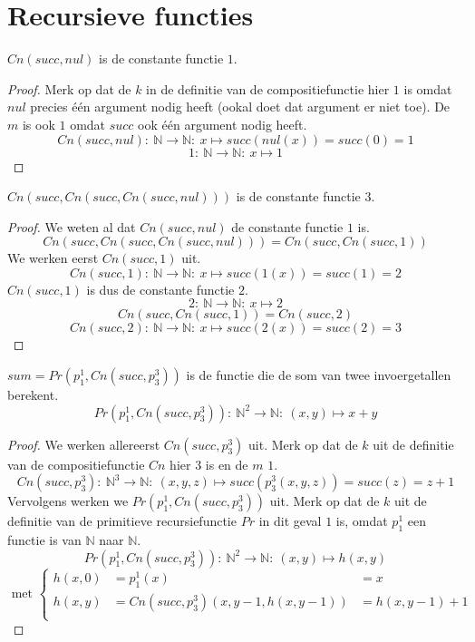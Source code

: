 \documentclass[main.tex]{subfiles}
\begin{document}
\section{Recursieve functies}
\label{sec:recursieve-functies}

\begin{vb}
  \label{vb:recursie-const-1}
  $Cn(succ,nul)$ is de constante functie $1$.

  \begin{proof}
    Merk op dat de $k$ in de definitie van de compositiefunctie hier $1$ is omdat $nul$ precies \'e\'en argument nodig heeft (ookal doet dat argument er niet toe).
    De $m$ is ook $1$ omdat $succ$ ook \'e\'en argument nodig heeft.
    \[ Cn(succ,nul):\ \mathbb{N} \rightarrow \mathbb{N}:\ x \mapsto succ(nul(x)) = succ(0) = 1\]
    \[ 1:\ \mathbb{N} \rightarrow \mathbb{N}:\ x \mapsto 1 \]
  \end{proof}
\end{vb}

\begin{vb}
  $Cn(succ,Cn(succ,Cn(succ,nul)))$ is de constante functie $3$.
  
  \begin{proof}
    We weten al dat $Cn(succ,nul)$ de constante functie $1$ is.
    \[ Cn(succ,Cn(succ,Cn(succ,nul))) =  Cn(succ,Cn(succ,1)) \]
    We werken eerst $Cn(succ,1)$ uit.
    \[ Cn(succ,1):\ \mathbb{N} \rightarrow \mathbb{N}:\ x \mapsto succ(1(x)) = succ(1) = 2 \]
    $Cn(succ,1)$ is dus de constante functie $2$.
    \[ 2:\ \mathbb{N} \rightarrow \mathbb{N}:\ x \mapsto 2 \]
    \[ Cn(succ,Cn(succ,1)) = Cn(succ,2)\]
    \[ Cn(succ,2):\ \mathbb{N} \rightarrow \mathbb{N}:\ x \mapsto succ(2(x)) = succ(2) = 3 \]
  \end{proof}
\end{vb}

\begin{vb}
  $sum = Pr(p_{1}^{1},Cn(succ,p_{3}^{3}))$ is de functie die de som van twee invoergetallen berekent.
  \[ Pr(p_{1}^{1},Cn(succ,p_{3}^{3})):\ \mathbb{N}^{2} \rightarrow \mathbb{N}:\ (x,y) \mapsto x+y \]

  \begin{proof}
    We werken allereerst $Cn(succ,p_{3}^{3})$ uit.
    Merk op dat de $k$ uit de definitie van de compositiefunctie $Cn$ hier $3$ is en de $m$ $1$.
    \[ Cn(succ,p_{3}^{3}):\ \mathbb{N}^{3} \rightarrow \mathbb{N}:\ (x,y,z) \mapsto succ(p_{3}^{3}(x,y,z)) = succ(z) = z+1 \]
    Vervolgens werken we $Pr(p_{1}^{1},Cn(succ,p_{3}^{3}))$ uit.
    Merk op dat de $k$ uit de definitie van de primitieve recursiefunctie $Pr$ in dit geval $1$ is, omdat $p_{1}^{1}$ een functie is van $\mathbb{N}$ naar $\mathbb{N}$.
    \[ Pr(p_{1}^{1},Cn(succ,p_{3}^{3})):\ \mathbb{N}^{2} \rightarrow \mathbb{N}:\ (x,y) \mapsto h(x,y) \]
    \[
    \text{ met }
    \left\{
      \begin{array}{rll}
        h(x,0) &= p_{1}^{1}(x) &= x\\
        h(x,y) &= Cn(succ,p_{3}^{3})(x,y-1,h(x,y-1)) &= h(x,y-1) + 1\\
      \end{array}
    \right.
    \]
  \end{proof}
\end{vb}
\end{document}
